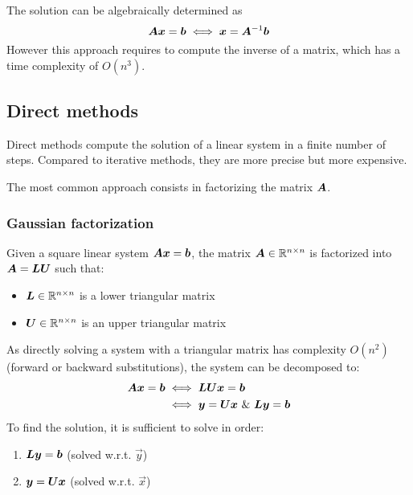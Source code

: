 The solution can be algebraically determined as 
\[ {\bm{A}}{\bm{x}} = {\bm{b}} \iff {\bm{x}} = {\bm{A}}^{-1}{\bm{b}} \]
However this approach requires to compute the inverse of a matrix, which has a time complexity of $O(n^3)$.



\subsection{Direct methods}
Direct methods compute the solution of a linear system in a finite number of steps.
Compared to iterative methods, they are more precise but more expensive.

The most common approach consists in factorizing the matrix ${\bm{A}}$.

\subsubsection{Gaussian factorization}
Given a square linear system ${\bm{A}}{\bm{x}} = {\bm{b}}$, 
the matrix ${\bm{A}} \in \mathbb{R}^{n \times n}$ is factorized into ${\bm{A}} = {\bm{L}}{\bm{U}}$ such that:
\begin{itemize}
    \item ${\bm{L}} \in \mathbb{R}^{n \times n}$ is a lower triangular matrix
    \item ${\bm{U}} \in \mathbb{R}^{n \times n}$ is an upper triangular matrix
\end{itemize}
%
As directly solving a system with a triangular matrix has complexity $O(n^2)$ (forward or backward substitutions), 
the system can be decomposed to:
\begin{equation}
    \begin{split}
        {\bm{A}}{\bm{x}} = {\bm{b}} & \iff {\bm{LU}}{\bm{x}} = {\bm{b}} \\
            & \iff {\bm{y}} = {\bm{U}}{\bm{x}} \text{ \& } {\bm{L}}{\bm{y}} = {\bm{b}}
    \end{split}
\end{equation}
To find the solution, it is sufficient to solve in order:
\begin{enumerate}
    \item ${\bm{L}}{\bm{y}} = {\bm{b}}$ (solved w.r.t. $\vec{y}$)
    \item ${\bm{y}} = {\bm{U}}{\bm{x}}$ (solved w.r.t. $\vec{x}$)
\end{enumerate}

